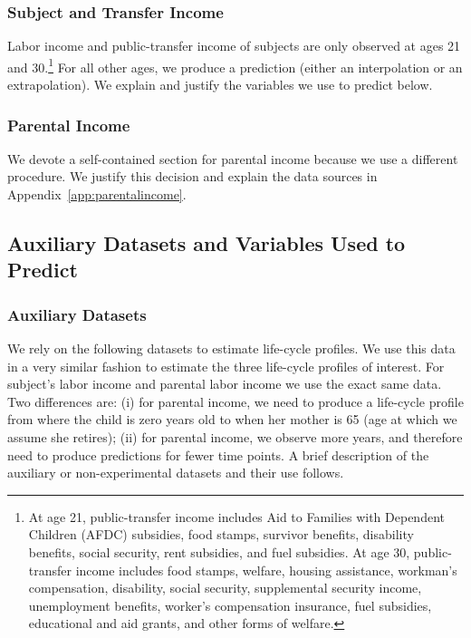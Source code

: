 \subsubsection{Subject and Transfer Income}

\noindent Labor income and public-transfer income of subjects are only observed at ages 21 and 30.\footnote{At age 21, public-transfer income includes Aid to Families with Dependent Children (AFDC) subsidies, food stamps, survivor benefits, disability benefits, social security, rent subsidies, and fuel subsidies. At age 30, public-transfer income includes food stamps, welfare, housing assistance, workman's compensation, disability, social security, supplemental security income, unemployment benefits, worker's compensation insurance, fuel subsidies, educational and aid grants, and other forms of welfare.} For all other ages, we produce a prediction (either an interpolation or an extrapolation). We explain and justify the variables we use to predict below.

\subsubsection{Parental Income}

\noindent We devote a self-contained section for parental income because we use a different procedure. We justify this decision and explain the data sources in Appendix~\ref{app:parentalincome}.

\subsection{Auxiliary Datasets and Variables Used to Predict}

\subsubsection{Auxiliary Datasets}

\noindent We rely on the following datasets to estimate life-cycle profiles. We use this data in a very similar fashion to estimate the three life-cycle profiles of interest. For subject's labor income and parental labor income we use the exact same data. Two differences are: (i) for parental income, we need to produce a life-cycle profile from where the child is zero years old to when her mother is 65 (age at which we assume she retires); (ii) for parental income, we observe more years, and therefore need to produce predictions for fewer time points. A brief description of the auxiliary or non-experimental datasets and their use follows.\\

